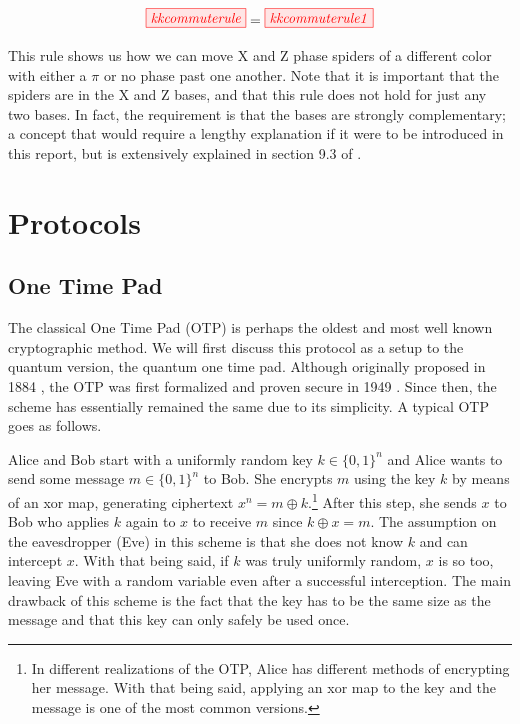\documentclass[]{article}
\begin{document}
\begin{equation}
\label{equation:kkcommuterule}
\tikzfig{kkcommuterule} = \tikzfig{kkcommuterule1}
\end{equation}

This rule shows us how we can move X and Z phase spiders of a different color with either a $\pi$ or no phase past one another. Note that it is important that the spiders are in the X and Z bases, and that this rule does not hold for just any two bases. In fact, the requirement is that the bases are strongly complementary; a concept that would require a lengthy explanation if it were to be introduced in this report, but is extensively explained in section 9.3 of \cite{Coecke2017}.

\section{Protocols}
\label{section:protocols}

\subsection{One Time Pad}

The classical One Time Pad (OTP) is perhaps the oldest and most well known cryptographic method. We will first discuss this protocol as a setup to the quantum version, the quantum one time pad. Although originally proposed in 1884 \cite{Markoff2011}, the OTP was first formalized and proven secure in 1949 \cite{Shannon1949}. Since then, the scheme has essentially remained the same due to its simplicity. A typical OTP goes as follows.

Alice and Bob start with a uniformly random key $k \in \{0,1\}^n$ and Alice wants to send some message $m \in \{0,1\}^n$ to Bob. She encrypts $m$ using the key $k$ by means of an xor map, generating ciphertext $x^n = m \oplus k$.\footnote{In different realizations of the OTP, Alice has different methods of encrypting her message. With that being said, applying an xor map to the key and the message is one of the most common versions.} After this step, she sends $x$ to Bob who applies $k$ again to $x$ to receive $m$ since $k \oplus x = m$. The assumption on the eavesdropper (Eve) in this scheme is that she does not know $k$ and can intercept $x$. With that being said, if $k$ was truly uniformly random, $x$ is so too, leaving Eve with a random variable even after a successful interception. The main drawback of this scheme is the fact that the key has to be the same size as the message and that this key can only safely be used once.
\end{document}
